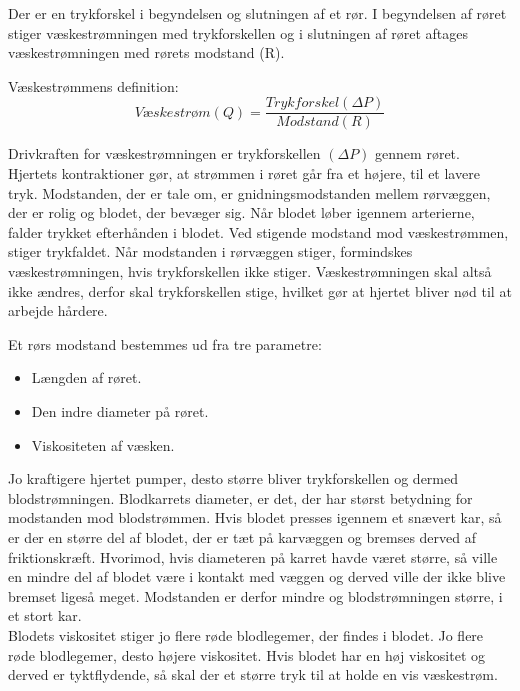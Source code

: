 Der er en trykforskel i begyndelsen og slutningen af et rør. I begyndelsen af røret stiger væskestrømningen med trykforskellen og i slutningen af røret aftages væskestrømningen med rørets modstand (R). 

Væskestrømmens definition: 
$$ Væskestrøm(Q)= \frac{Trykforskel(\Delta P)}{Modstand(R)}$$

Drivkraften for væskestrømningen er trykforskellen $(\Delta P)$ gennem røret. Hjertets kontraktioner gør, at strømmen i røret går fra et højere, til et lavere tryk. 
Modstanden, der er tale om, er gnidningsmodstanden mellem rørvæggen, der er rolig og blodet, der bevæger sig. 
Når blodet løber igennem arterierne, falder trykket efterhånden i blodet. Ved stigende modstand mod væskestrømmen, stiger trykfaldet. 
Når modstanden i rørvæggen stiger, formindskes væskestrømningen, hvis trykforskellen ikke stiger.
Væskestrømningen skal altså ikke ændres, derfor skal trykforskellen stige, hvilket gør at hjertet bliver nød til at arbejde hårdere. 

Et rørs modstand bestemmes ud fra tre parametre: 

\begin{itemize}
\item Længden af røret.
\item Den indre diameter på røret. 
\item Viskositeten af væsken.
\end{itemize}

Jo kraftigere hjertet pumper, desto større bliver trykforskellen og dermed blodstrømningen. 
Blodkarrets diameter, er det, der har størst betydning for modstanden mod blodstrømmen. Hvis blodet presses igennem et snævert kar, så er der en større del af blodet, der er tæt på karvæggen og bremses derved af friktionskræft. Hvorimod, hvis diameteren på karret havde været større, så ville en mindre del af blodet være i kontakt med væggen og derved ville der ikke blive bremset ligeså meget. Modstanden er derfor mindre og blodstrømningen større, i et stort kar. \\
Blodets viskositet stiger jo flere røde blodlegemer, der findes i blodet. Jo flere røde blodlegemer, desto højere viskositet. Hvis blodet har en høj viskositet og derved er tyktflydende, så skal der et større tryk til at holde en vis væskestrøm. 
   
